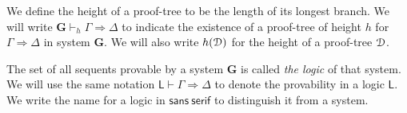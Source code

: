 We define the height of a proof-tree to be the length of its longest branch.
We will write $\mathbf{G} \vdash_h \Gamma \Rightarrow \Delta$ to indicate the existence of a proof-tree of height $h$ for $\Gamma \Rightarrow \Delta$ in system $\mathbf{G}$. We will also write $h(\mathcal{D})$ for the height of a proof-tree $\mathcal{D}$.

The set of all sequents provable by a system $\mathbf{G}$ is called \emph{the logic} of that system. We will use the same notation $\mathsf{L} \vdash \Gamma \Rightarrow \Delta$ to denote the provability in a logic $\mathsf{L}$. We write the name for a logic in $\mathsf{sans~serif}$ to distinguish it from a system.